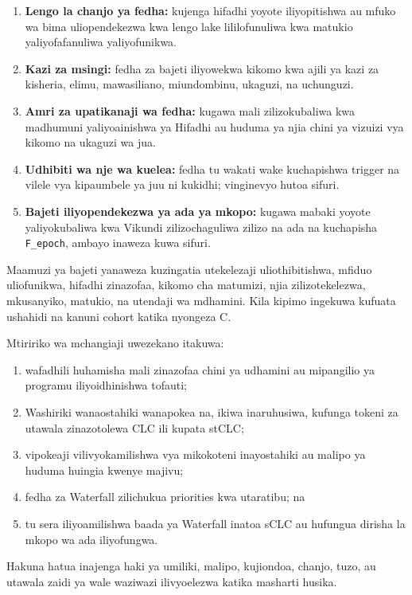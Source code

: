 \documentclass[11pt]{article}
\begin{document}
\begin{enumerate}[leftmargin=*]
\item \textbf{Lengo la chanjo ya fedha:} kujenga hifadhi yoyote iliyopitishwa au mfuko wa bima uliopendekezwa kwa lengo lake lililofunuliwa kwa matukio yaliyofafanuliwa yaliyofunikwa.
\item \textbf{Kazi za msingi:} fedha za bajeti iliyowekwa kikomo kwa ajili ya kazi za kisheria, elimu, mawasiliano, miundombinu, ukaguzi, na uchunguzi.
\item \textbf{Amri za upatikanaji wa fedha:} kugawa mali zilizokubaliwa kwa madhumuni yaliyoainishwa ya Hifadhi au huduma ya njia chini ya vizuizi vya kikomo na ukaguzi wa jua.
\item \textbf{Udhibiti wa nje wa kuelea:} fedha tu wakati wake kuchapishwa trigger na vilele vya kipaumbele ya juu ni kukidhi; vinginevyo hutoa sifuri.
\item \textbf{Bajeti iliyopendekezwa ya ada ya mkopo:} kugawa mabaki yoyote yaliyokubaliwa kwa Vikundi zilizochaguliwa zilizo na ada na kuchapisha \texttt{F\_epoch}, ambayo inaweza kuwa sifuri.
\end{enumerate}
Maamuzi ya bajeti yanaweza kuzingatia utekelezaji uliothibitishwa, mfiduo uliofunikwa, hifadhi zinazofaa, kikomo cha matumizi, njia zilizotekelezwa, mkusanyiko, matukio, na utendaji wa mdhamini. Kila kipimo ingekuwa kufuata ushahidi na kanuni cohort katika nyongeza C.

Mtiririko wa mchangiaji uwezekano itakuwa:

\begin{enumerate}[leftmargin=*]
\item wafadhili huhamisha mali zinazofaa chini ya udhamini au mipangilio ya programu iliyoidhinishwa tofauti;
\item Washiriki wanaostahiki wanapokea na, ikiwa inaruhusiwa, kufunga tokeni za utawala zinazotolewa CLC ili kupata stCLC;
\item vipokeaji vilivyokamilishwa vya mikokoteni inayostahiki au malipo ya huduma huingia kwenye majivu;
\item fedha za Waterfall zilichukua priorities kwa utaratibu; na
\item tu sera iliyoamilishwa baada ya Waterfall inatoa sCLC au hufungua dirisha la mkopo wa ada iliyofungwa.
\end{enumerate}
Hakuna hatua inajenga haki ya umiliki, malipo, kujiondoa, chanjo, tuzo, au utawala zaidi ya wale waziwazi ilivyoelezwa katika masharti husika.
\end{document}

